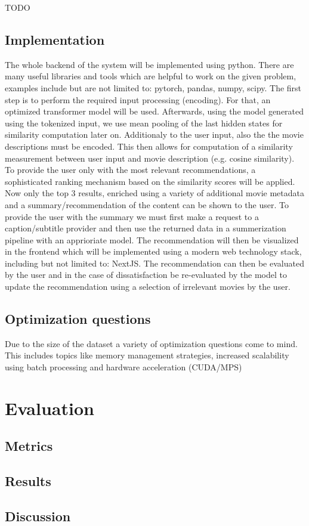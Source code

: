 \documentclass[11pt,a4paper]{article}
\begin{document}
  TODO

  \subsection{Implementation}

  The whole backend of the system will be implemented using python.
  There are many useful libraries and tools which are helpful to work on the given problem, examples include but are not limited to: pytorch, pandas, numpy, scipy.
  The first step is to perform the required input processing (encoding).
  For that, an optimized transformer model will be used.
  Afterwards, using the model generated using the tokenized input, we use mean pooling of the last hidden states for similarity computation later on.
  Additionaly to the user input, also the the movie descriptions must be encoded.
  This then allows for computation of a similarity measurement between user input and movie description (e.g. cosine similarity).
  To provide the user only with the most relevant recommendations, a sophisticated ranking mechanism based on the similarity scores will be applied.
  Now only the top 3 results, enriched using a variety of additional movie metadata and a summary/recommendation of the content can be shown to the user.
  To provide the user with the summary we must first make a request to a caption/subtitle provider and then use the returned data in a summerization pipeline with an apprioriate model.
  The recommendation will then be visualized in the frontend which will be implemented using a modern web technology stack, including but not limited to: NextJS.
  The recommendation can then be evaluated by the user and in the case of dissatisfaction be re-evaluated by the model to update the recommendation using a selection of irrelevant movies by the user.

  \subsection{Optimization questions}
  Due to the size of the dataset a variety of optimization questions come to mind.
  This includes topics like memory management strategies, increased scalability using batch processing and hardware acceleration (CUDA/MPS)

  \section{Evaluation}
  \subsection{Metrics}

  \subsection{Results}

  \subsection{Discussion}
\end{document}

